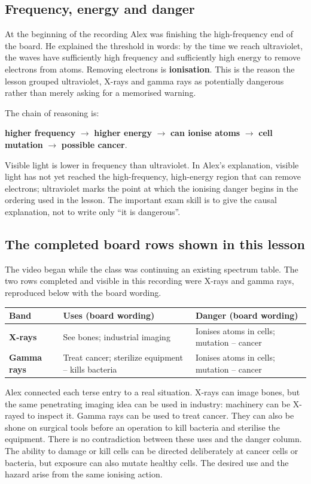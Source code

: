 \documentclass[11pt,a4paper]{article}
\begin{document}
\subsection*{Frequency, energy and danger}
At the beginning of the recording Alex was finishing the high-frequency end of the board. He explained the threshold in words: by the time we reach ultraviolet, the waves have sufficiently high frequency and sufficiently high energy to remove electrons from atoms. Removing electrons is \textbf{ionisation}. This is the reason the lesson grouped ultraviolet, X-rays and gamma rays as potentially dangerous rather than merely asking for a memorised warning.

The chain of reasoning is:
\begin{center}
\textbf{higher frequency} $\longrightarrow$ \textbf{higher energy} $\longrightarrow$ \textbf{can ionise atoms} $\longrightarrow$ \textbf{cell mutation} $\longrightarrow$ \textbf{possible cancer}.
\end{center}
Visible light is lower in frequency than ultraviolet. In Alex's explanation, visible light has not yet reached the high-frequency, high-energy region that can remove electrons; ultraviolet marks the point at which the ionising danger begins in the ordering used in the lesson. The important exam skill is to give the causal explanation, not to write only ``it is dangerous''.

\subsection*{The completed board rows shown in this lesson}
The video began while the class was continuing an existing spectrum table. The two rows completed and visible in this recording were X-rays and gamma rays, reproduced below with the board wording.

\renewcommand{\arraystretch}{1.28}
\begin{tabularx}{\linewidth}{>{\bfseries}p{.14\linewidth}YY}
\toprule
Band & Uses (board wording) & Danger (board wording)\\
\midrule
X-rays & See bones; industrial imaging & Ionises atoms in cells; mutation -- cancer\\
Gamma rays & Treat cancer; sterilize equipment -- kills bacteria & Ionises atoms in cells; mutation -- cancer\\
\bottomrule
\end{tabularx}

Alex connected each terse entry to a real situation. X-rays can image bones, but the same penetrating imaging idea can be used in industry: machinery can be X-rayed to inspect it. Gamma rays can be used to treat cancer. They can also be shone on surgical tools before an operation to kill bacteria and sterilise the equipment. There is no contradiction between these uses and the danger column. The ability to damage or kill cells can be directed deliberately at cancer cells or bacteria, but exposure can also mutate healthy cells. The desired use and the hazard arise from the same ionising action.
\end{document}
